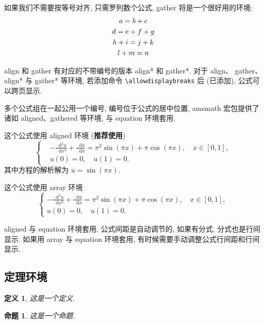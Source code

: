 \documentclass[a4paper,12pt]{article}
\theoremstyle{plain}
\newtheorem{definition}{定义}[section]
\newtheorem{proposition}{命题}[section]
\newcommand{\dif}{\mathop{}\!\mathrm{d}}
\begin{document}
如果我们不需要按等号对齐, 只需罗列数个公式, gather 将是一个很好用的环境:
\begin{gather}
a = b + c \\
d = e + f + g \\
h + i = j + k \notag \\
l + m = n
\end{gather}

align 和 gather 有对应的不带编号的版本 align* 和 gather*.
对于 align、 gather、align* 与 gather* 等环境, 若添加命令 \verb|\allowdisplaybreaks| 后 (已添加), 公式可以跨页显示.

多个公式组在一起公用一个编号, 编号位于公式的居中位置, amsmath 宏包提供了诸如 aligned、gathered 等环境, 与 equation 环境套用.

这个公式使用 aligned 环境 (\textbf{推荐使用})
\begin{equation}\label{eq:alignedEq}
\left\{\begin{aligned}
  &-\frac{{\dif}^{2} u}{\dif x^{2}}+\frac{\dif u}{\dif x}=\pi^{2} \sin (\pi x)+\pi \cos (\pi x),\quad x \in [0,1], \\
  &u(0)=0,\quad u(1)=0.
\end{aligned} \right.
\end{equation}
其中方程的解析解为 $u=\sin(\pi x)$.

这个公式使用 array 环境
\begin{equation}\label{eq:arrayEq}
\left\{\begin{array}{l}
\displaystyle
-\frac{{\dif}^{2} u}{\dif x^{2}}+\frac{\dif u}{\dif x}=\pi^{2} \sin (\pi x)+\pi \cos (\pi x),\quad x \in [0,1], \\[6pt]
u(0)=0,\quad u(1)=0.
\end{array} \right.
\end{equation}

aligned 与 equation 环境套用, 公式间距是自动调节的, 如果有分式, 分式也是行间显示. 如果用 array 与 equation 环境套用, 有时候需要手动调整公式行间距和行间显示.

\subsection{定理环境}

\begin{definition}\label{def:foo}
这是一个定义.
\end{definition}

\begin{proposition}\label{prop:foo}
这是一个命题.
\end{proposition}
\end{document}
